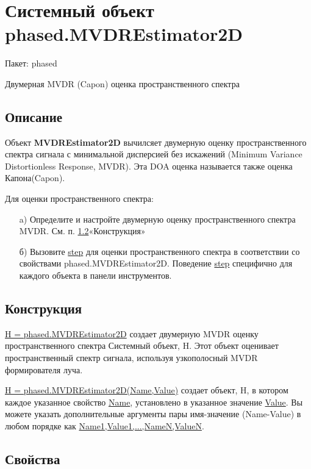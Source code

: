 \section{Системный объект phased.MVDREstimator2D}

Пакет: phased

Двумерная MVDR (Capon) оценка пространственного спектра

\subsection{Описание}

Объект \textbf{MVDREstimator2D} вычилсяет двумерную оценку пространственного спектра сигнала с минимальной дисперсией без искажений (Minimum Variance Distortionless Response, MVDR). Эта DOA оценка называется также оценка Капона(Capon).

Для оценки пространственного спектра:

\begin{enumerate}
	\item[\sffamily a)] Определите и настройте двумерную оценку пространственного спектра MVDR. См. п. \ref{Construction}«Конструкция»
	\item[\sffamily б)] Вызовите \underline{step} для оценки пространственного спектра в соответствии со свойствами phased.MVDREstimator2D. Поведение \underline{step} специфично для каждого объекта в панели инструментов.
\end{enumerate}

\subsection{Конструкция}\label{Construction}

\underline{H = phased.MVDREstimator2D} создает двумерную MVDR оценку пространственного спектра Системный объект, H. Этот объект оценивает пространственный спектр сигнала, используя узкополосный MVDR формирователя луча. 

\underline{H = phased.MVDREstimator2D(Name,Value)} создает объект, H, в котором каждое указанное свойство \underline{Name}, установлено в указанное значение \underline{Value}. Вы можете указать дополнительные аргументы пары имя-значение (Name-Value) в любом порядке как \underline{Name1,Value1,...,NameN,ValueN}.

\subsection{Свойства}

